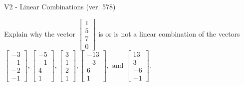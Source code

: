 \begin{exercise}
  \begin{exerciseTitle}V2 - Linear Combinations (ver. 578)\end{exerciseTitle}
  \begin{exerciseStatement}
    Explain why the vector \(\left[\begin{array}{c}
1 \\
5 \\
7 \\
0
\end{array}\right]\)  is or is not a linear 
	combination of the vectors \(\left[\begin{array}{c}
-3 \\
-1 \\
-2 \\
-1
\end{array}\right] , \left[\begin{array}{c}
-5 \\
-1 \\
4 \\
1
\end{array}\right] , \left[\begin{array}{c}
3 \\
1 \\
2 \\
1
\end{array}\right] , \left[\begin{array}{c}
-13 \\
-3 \\
6 \\
1
\end{array}\right] , \text{ and } \left[\begin{array}{c}
13 \\
3 \\
-6 \\
-1
\end{array}\right]\).
	



\end{exerciseStatement}
\end{exercise}
